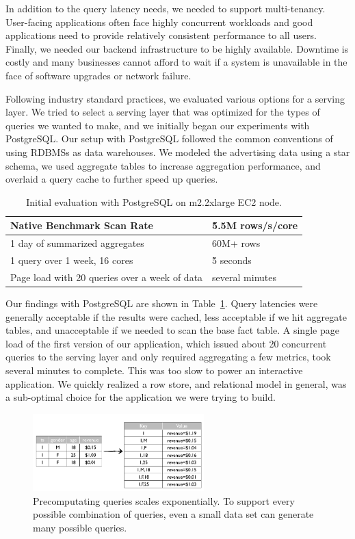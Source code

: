 \documentclass{vldb}
\begin{document}
In addition to the query latency needs, we needed to support multi-tenancy.
User-facing applications often face highly concurrent workloads and good
applications need to provide relatively consistent performance to all users.
Finally, we needed our backend infrastructure to be highly available. Downtime
is costly and many businesses cannot afford to wait if a system is unavailable
in the face of software upgrades or network failure.

Following industry standard practices, we evaluated various options for a
serving layer. We tried to select a serving layer that was optimized for the
types of queries we wanted to make, and we initially began our experiments with
PostgreSQL\cite{stonebraker1987extendability}. Our setup with PostgreSQL
followed the common conventions of using RDBMSs as data warehouses. We modeled
the advertising data using a star schema, we used aggregate tables to
increase aggregation performance, and overlaid a query cache to further speed up
queries.

\begin{table}
\centering
\scriptsize\begin{tabular}{| l | l |}
  \hline
  Native Benchmark Scan Rate & \~5.5M rows/s/core \\ \hline
  1 day of summarized aggregates & 60M+ rows \\ \hline
  1 query over 1 week, 16 cores & \~5 seconds \\ \hline
  Page load with 20 queries over a week of data & several minutes \\ \hline
\end{tabular}
\normalsize
\caption{Initial evaluation with PostgreSQL on m2.2xlarge EC2 node.}
\label{tab:postgres_results}
\end{table}

Our findings with PostgreSQL are shown in Table~\ref{tab:postgres_results}.
Query latencies were generally acceptable if the results were cached, less
acceptable if we hit aggregate tables, and unacceptable if we needed to scan
the base fact table. A single page load of the first version of our
application, which issued about 20 concurrent queries to the serving layer and
only required aggregating a few metrics, took several minutes to complete. This
was too slow to power an interactive application. We quickly realized a row
store, and relational model in general, was a sub-optimal choice for the
application we were trying to build.

\begin{figure}
\centering
\includegraphics[width = 2.6in]{precompute}
\caption{Precomputating queries scales exponentially. To support every possible
combination of queries, even a small data set can generate many possible
queries.
}
\label{fig:precompute}
\end{figure}
\end{document}

